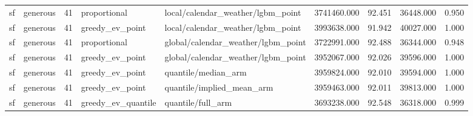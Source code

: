\begin{tabular}{llrllrrrr}
sf & generous & 41 & proportional & local/calendar\_weather/lgbm\_point & 3741460.000 & 92.451 & 36448.000 & 0.950 \\
sf & generous & 41 & greedy\_ev\_point & local/calendar\_weather/lgbm\_point & 3993638.000 & 91.942 & 40027.000 & 1.000 \\
sf & generous & 41 & proportional & global/calendar\_weather/lgbm\_point & 3722991.000 & 92.488 & 36344.000 & 0.948 \\
sf & generous & 41 & greedy\_ev\_point & global/calendar\_weather/lgbm\_point & 3952067.000 & 92.026 & 39596.000 & 1.000 \\
sf & generous & 41 & greedy\_ev\_point & quantile/median\_arm & 3959824.000 & 92.010 & 39594.000 & 1.000 \\
sf & generous & 41 & greedy\_ev\_point & quantile/implied\_mean\_arm & 3959463.000 & 92.011 & 39813.000 & 1.000 \\
sf & generous & 41 & greedy\_ev\_quantile & quantile/full\_arm & 3693238.000 & 92.548 & 36318.000 & 0.999 \\
\bottomrule
\end{tabular}
